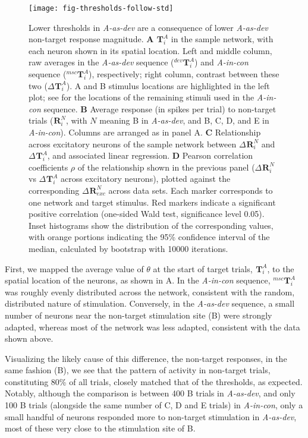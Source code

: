 \documentclass[9pt,lineno,onehalfspacing]{elife}
\newcommand{\dev}{\textit{A-as-dev}}
\newcommand{\msc}{\textit{A-in-con}}
\newcommand{\R}[3][]{{}^{#1}_{}\boldsymbol R^{#2}_{#3}}
\newcommand{\T}[3][]{{}^{#1}_{}\boldsymbol T^{#2}_{#3}}
\begin{document}
\begin{figure}
    \texttt{[image: fig-thresholds-follow-std]}
    \caption{%
        Lower thresholds in \dev{} are a consequence of lower \dev{} non-target response magnitude.
        \textbf{A} $\T{A}{i}$ in the sample network, with each neuron shown in its spatial location. Left and middle column, raw averages in the \dev{} sequence ($\T[dev]{A}{i}$) and \msc{} sequence ($\T[msc]{A}{i}$), respectively; right column, contrast between these two ($\Delta \T{A}{i}$). A and B stimulus locations are highlighted in the left plot; see  for the locations of the remaining stimuli used in the \msc{} sequence.
        \textbf{B} Average response (in spikes per trial) to non-target trials ($\R{N}{i}$, with $N$ meaning B in \dev{}, and B, C, D, and E in \msc{}). Columns are arranged as in panel A.
        \textbf{C} Relationship across excitatory neurons of the sample network between $\Delta \R{N}{i}$ and $\Delta \T{A}{i}$, and associated linear regression.
        \textbf{D} Pearson correlation coefficients $\rho$ of the relationship shown in the previous panel ($\Delta \R{N}{i}$ vs $\Delta \T{A}{i}$ across excitatory neurons), plotted against the corresponding $\Delta \R{N}{exc}$ across data sets. Each marker corresponds to one network and target stimulus. Red markers indicate a significant positive correlation (one-sided Wald test, significance level 0.05). Inset histograms show the distribution of the corresponding values, with orange portions indicating the 95\% confidence interval of the median, calculated by bootstrap with 10000 iterations.
    }
    \label{fig:thresholds-follow-std}
\end{figure}

First, we mapped the average value of $\theta$ at the start of target trials, $\T{A}{i}$, to the spatial location of the neurons, as shown in A. In the \msc{} sequence, $\T[msc]{A}{i}$ was roughly evenly distributed across the network, consistent with the random, distributed nature of stimulation. Conversely, in the \dev{} sequence, a small number of neurons near the non-target stimulation site (B) were strongly adapted, whereas most of the network was less adapted, consistent with the data shown above.

Visualizing the likely cause of this difference, the non-target responses, in the same fashion (B), we see that the pattern of activity in non-target trials, constituting 80\% of all trials, closely matched that of the thresholds, as expected. Notably, although the comparison is between 400 B trials in \dev{}, and only 100 B trials (alongside the same number of C, D and E trials) in \msc{}, only a small handful of neurons responded more to non-target stimulation in \dev{}, most of these very close to the stimulation site of B.
\end{document}
